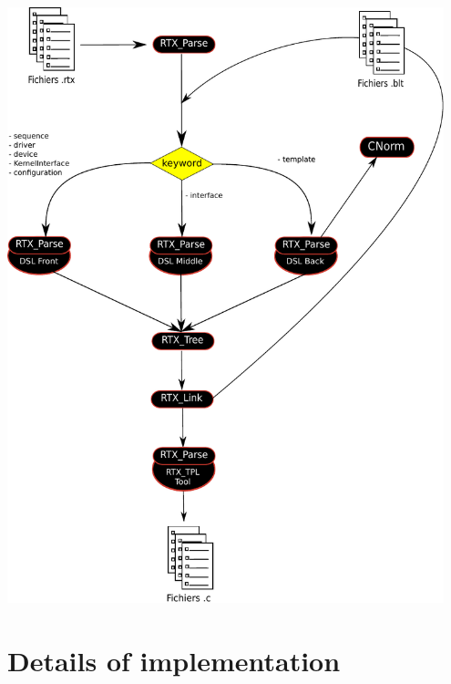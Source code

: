 \documentclass[american]{rtxreport}
\begin{document}
\includegraphics[width=0.95\textwidth]{logigramme.pdf}



\chapter{Details of implementation}
\end{document}

